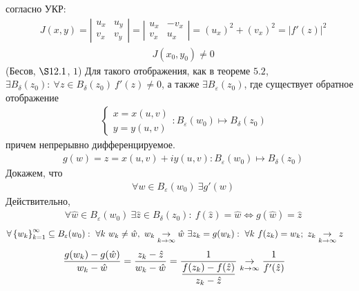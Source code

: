 согласно УКР:
\begin{align*}
  & J(x,y) = \left| \begin{matrix}
          u_x & u_y \\
          v_x & v_y
      \end{matrix} \right| = \left| \begin{matrix}
          u_x & -v_x \\
          v_x & u_x
      \end{matrix} \right| = (u_x)^2+(v_x)^2 = \left| f'(z) \right|^2
\end{align*}
\begin{align*}
  & J(x_0,y_0) \neq 0
\end{align*}
\theorem (Бесов, $\S 12.1$, $1$)
Для такого отображения, как в теореме $5.2$, $\exists B_\delta(z_0): \ \forall z
\in B_\delta(z_0) \ f'(z) \neq 0 $, а также $\exists B_\varepsilon(z_0)$, где
существует обратное отображение
\begin{align*}
  & \left\{ \begin{matrix}
          x = x(u,v) \\
          y = y(u,v)
      \end{matrix} \right.: B_\varepsilon(w_0) \mapsto B_\delta(z_0)
\end{align*}
причем непрерывно дифференцируемое.
\pr
\begin{align*}
  & g(w) = z = x(u,v) + iy(u,v): B_\varepsilon(w_0) \mapsto B _\delta(z_0)
\end{align*}
Докажем, что
\begin{align*}
  &\forall w \in B_\varepsilon(w_0) \ \exists g'(w)
\end{align*}
Действительно,
\begin{align*}
  & \forall \hat{w} \in B_\varepsilon(w_0) \ \exists \hat{z} \in B_\delta(z_0): \ f(\hat{z}) = \hat{w} \Leftrightarrow g(\hat{w}) = \hat{z}
\end{align*}
\begin{align*}
  & \forall \left\{ w_k \right\}_{k=1}^\infty \subseteq B_\varepsilon(w_0): \ \forall k \ w_k \neq \hat{w}, \ w_k \underset{k \to \infty}{\to} \hat{w} \ \exists z_k = g(w_k): \ \forall k \ f(z_k) = w_k; \ z_k \underset{k \to \infty}{\to} z
\end{align*}
\begin{align*}
  & \frac{g(w_k) - g(\hat{w})}{w_k - \hat{w}} = \frac{z_k - \hat{z}}{w_k - \hat{w}} = \frac{1}{\displaystyle \frac{f(z_k) - f(\hat{z})}{z_k - \hat{z}}} \underset{k \to \infty}{\to} \frac{1}{f'(\hat{z})}
\end{align*}
